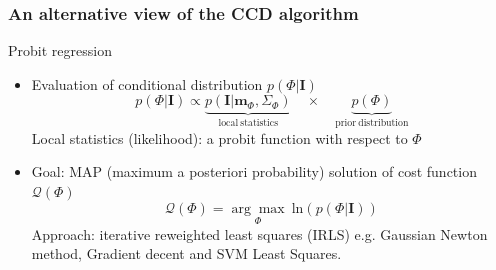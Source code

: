 \documentclass[english,10pt,presentation]{beamer}
\begin{document}
\begin{frame}
\frametitle{An alternative view of the CCD algorithm}
\label{sec-2_4}
\begin{exampleblock}{Probit regression}
\label{sec-2_4_1}
\begin{itemize}

\item Evaluation of conditional distribution $p(\Phi|\mathbf{I})$
\label{sec-2_4_1_1}%
\begin{displaymath}
p(\Phi|\mathbf{I})
\propto \underbrace{p(\mathbf{I}|\mathbf{m}_{\Phi},
\Sigma_{\Phi})}_{\mathrm{local\ statistics}}\quad\times\quad
\underbrace{p(\Phi)}_{\mathrm{prior\ distribution}}
\end{displaymath}
Local statistics (likelihood): a probit function with
respect to $\Phi$

\item Goal: MAP (maximum a posteriori probability) solution of cost function $\mathcal{Q}(\Phi)$
\label{sec-2_4_1_2}%
\begin{displaymath}
\mathcal{Q}(\Phi) = \underset{\Phi}{\arg\max}\ \mathrm{ln}(p(\Phi|\mathbf{I}))
\end{displaymath}
Approach: iterative reweighted least  squares (IRLS) e.g. Gaussian
Newton method, Gradient decent and SVM Least Squares.

\end{itemize} %
\end{exampleblock}
\end{frame}
\end{document}
